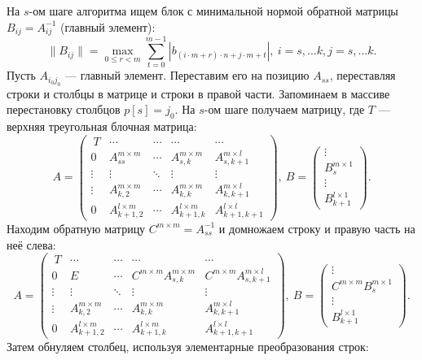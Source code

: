 \documentclass[a4paper,12pt]{article}
\begin{document}
На $s$-ом шаге алгоритма ищем блок с минимальной нормой обратной матрицы $B_{ij} = A_{ij}^{-1}$ (главный элемент):
$$
\|B_{ij}\| = \max_{0 \leq r < m} \sum_{t=0}^{m-1} |b_{(i \cdot m + r) \cdot n + j \cdot m + t}|,\ i = s,\dots k, j =s,\dots k.
$$
Пусть $A_{i_0j_0}$ — главный элемент. Переставим его на позицию $A_{ss}$, переставляя строки и столбцы в матрице и строки в правой части. Запоминаем в массиве перестановку столбцов $p[s] = j_0$. На $s$-ом шаге получаем матрицу, где $T$ — верхняя треугольная блочная матрица:
$$A=
  \begin{pmatrix} 
    \ T & \cdots & \cdots & \cdots & \cdots \\
    0  & A_{ss}^{m \times m} & \cdots & A_{s,k}^{m \times m} & A_{s,k+1}^{m \times l} \\ 
    \vdots & \vdots & \ddots & \vdots & \vdots \\ 
    \vdots& A_{k,2}^{m \times m} & \cdots & A_{k,k}^{m \times m} & A_{k,k+1}^{m \times l} \\
    0 & A_{k+1,2}^{l \times m} & \cdots & A_{k+1,k}^{l \times m} & A_{k+1,k+1}^{l \times l} 
  \end{pmatrix},\ 
  B=
  \begin{pmatrix}
  \vdots \\
  B_{s}^{m\times 1}\\
  \vdots\\
  B_{k+1}^{l\times 1}
  \end{pmatrix}.
$$
Находим обратную матрицу $C^{m\times m} = A^{-1}_{ss}$ и домножаем строку и правую часть на неё слева:
$$A=
  \begin{pmatrix} 
    \ T & \cdots & \cdots & \cdots & \cdots \\
    0  & E & \cdots & C^{m\times m}A_{s,k}^{m \times m} & C^{m\times m}A_{s,k+1}^{m \times l} \\ 
    \vdots & \vdots & \ddots & \vdots & \vdots \\ 
    \vdots& A_{k,2}^{m \times m} & \cdots & A_{k,k}^{m \times m} & A_{k,k+1}^{m \times l} \\
    0 & A_{k+1,2}^{l \times m} & \cdots & A_{k+1,k}^{l \times m} & A_{k+1,k+1}^{l \times l} 
  \end{pmatrix},\ 
  B=
  \begin{pmatrix}
  \vdots \\
  C^{m\times m}B_{s}^{m\times 1}\\
  \vdots\\
  B_{k+1}^{l\times 1}
  \end{pmatrix}.
$$
Затем обнуляем столбец, используя элементарные преобразования строк:
\end{document}
